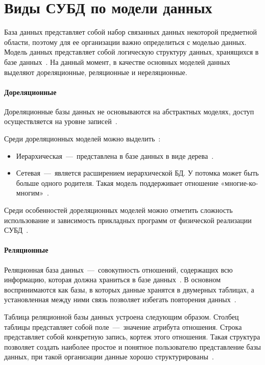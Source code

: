 \section{Виды СУБД по модели данных}

База данных представляет собой набор связанных данных некоторой предметной области, поэтому для ее организации важно определиться с моделью данных. Модель данных представляет собой логическую структуру данных, хранящихся в базе данных~\cite{хомоненко2000базы}. На данный момент, в качестве основных моделей данных выделяют дореляционные, реляционные и нереляционные.

\paragraph{Дореляционные} \mbox{}

Дореляционные базы данных не основываются на абстрактных моделях, доступ осуществляется на уровне записей~\cite{бородин2016задаче}. 

Среди дореляционных моделей можно выделить~\cite{дадян2016методы}:
\begin{itemize}
	\item Иерархическая~---~представлена в базе данных в виде дерева~\cite{корягин2020модели}.
	\item Сетевая~---~является расширением иерархической БД. У потомка может быть больше одного родителя. Такая модель поддерживает отношение «многие-ко-многим»~\cite{корягин2020модели}. 
\end{itemize}

Среди особенностей дореляционных моделей можно отметить сложность использование и зависимость прикладных программ от физической реализации СУБД~\cite{бородин2016задаче}. 

\paragraph{Реляционные} \mbox{}

Реляционная база данных~---~совокупность отношений, содержащих всю информацию, которая должна храниться в базе данных~\cite{кириллов2012введение}. В основном воспринимаются как базы, в которых данные хранятся в двумерных таблицах, а установленная между ними связь позволяет избегать повторения данных~\cite{жалолов2020понятие}.


Таблица реляционной базы данных устроена следующим образом. Столбец таблицы представляет собой поле~---~значение атрибута отношения. Строка представляет собой конкретную запись, кортеж этого отношения. Такая структура позволяет создать наиболее простое и понятное пользователю представление базы данных, при такой организации данные хорошо структурированы~\cite{бородин2016задаче}. 


